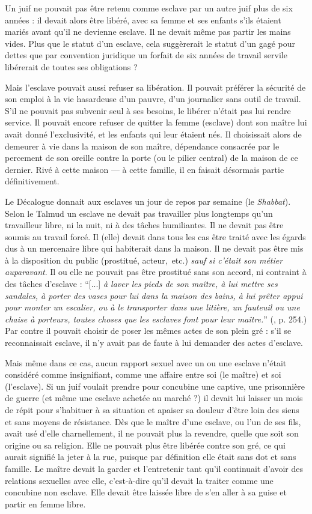  Un juif ne pouvait pas être retenu comme esclave par un autre juif plus de six années : il devait alors être libéré, avec sa femme et ses enfants s'ils étaient mariés avant qu'il ne devienne esclave. Il ne devait même pas partir les mains vides. Plus que le statut d'un esclave, cela suggèrerait le statut d'un gagé pour dettes que par convention juridique un forfait de six années de travail servile libérerait de toutes ses obligations ?

 Mais l'esclave pouvait aussi refuser sa libération. Il pouvait préférer la sécurité de son emploi à la vie hasardeuse d'un pauvre, d'un journalier sans outil de travail. S'il ne pouvait pas subvenir seul à ses besoins, le libérer n'était pas lui rendre service. Il pouvait encore refuser de quitter la femme (esclave) dont son maître lui avait donné l'exclusivité, et les enfants qui leur étaient nés. Il choisissait alors de demeurer à vie dans la maison de son maître, dépendance consacrée par le percement de son oreille contre la porte (ou le pilier central) de la maison de ce dernier. Rivé à cette maison --- à cette famille, il en faisait désormais partie définitivement.

 Le Décalogue donnait aux esclaves un jour de repos par semaine (le \emph{Shabbat}). Selon le Talmud un esclave ne devait pas travailler plus longtemps qu'un travailleur libre, ni la nuit, ni à des tâches humiliantes. Il ne devait pas être soumis au travail forcé. Il (elle) devait dans tous les cas être traité avec les égards dus à un mercenaire libre qui habiterait dans la maison. Il ne devait pas être mis à la disposition du public (prostitué, acteur,~etc.) \emph{sauf si c'était son métier auparavant}. Il ou elle ne pouvait pas être prostitué sans son accord, ni contraint à des tâches d'esclave : \enquote{[...] \emph{à laver les pieds de son maître, à lui mettre ses sandales, à porter des vases pour lui dans la maison des bains, à lui prêter appui pour monter un escalier, ou à le transporter dans une litière, un fauteuil ou une chaise à porteurs, toutes choses que les esclaves font pour leur maître.}} (, p. 254.) Par contre il pouvait choisir de poser les mêmes actes de son plein gré : s'il se reconnaissait esclave, il n'y avait pas de faute à lui demander des actes d'esclave.

 Mais même dans ce cas, aucun rapport sexuel avec un ou une esclave n'était considéré comme insignifiant, comme une affaire entre soi (le maître) et soi (l'esclave). Si un juif voulait prendre pour concubine une captive, une prisonnière de guerre (et même une esclave achetée au marché ?) il devait lui laisser un mois de répit pour s'habituer à sa situation et apaiser sa douleur d'être loin des siens et sans moyens de résistance. Dès que le maître d'une esclave, ou l'un de ses fils, avait usé d'elle charnellement, il ne pouvait plus la revendre, quelle que soit son origine ou sa religion. Elle ne pouvait plus être libérée contre son gré, ce qui aurait signifié la jeter à la rue, puisque par définition elle était sans dot et sans famille. Le maître devait la garder et l'entretenir tant qu'il continuait d'avoir des relations sexuelles avec elle, c'est-à-dire qu'il devait la traiter comme une concubine non esclave. Elle devait être laissée libre de s'en aller à sa guise et partir en femme libre.

